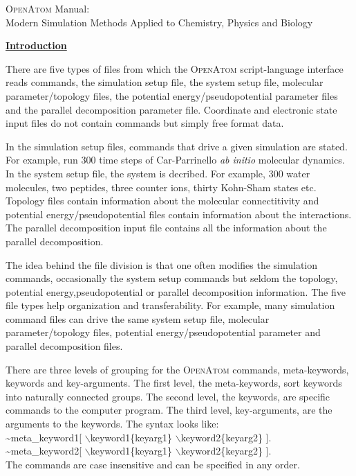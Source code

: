 \documentclass[12pt]{article}
\begin{document}
\large


\vspace*{3.in}
\begin{center}
\huge
\textsc{OpenAtom} Manual: \\
$\ $ \\
\Large
Modern Simulation Methods Applied to Chemistry, Physics and Biology
\end{center}

\clearpage
\huge
\underline{\bf Introduction}
\large

There are five types of files from which the \textsc{OpenAtom}
script-language interface reads commands, the
simulation setup file, the system setup file, molecular parameter/topology
files, the potential energy/pseudopotential parameter files and the
parallel decomposition parameter file. Coordinate and electronic state input files do 
not contain commands but simply free format data. 

In the simulation setup files, commands that drive a given simulation
are stated. For example, run 300 time steps of Car-Parrinello {\em ab initio}
molecular dynamics. In the system setup file, the 
system is decribed. For example, 300 water molecules, two peptides,
three counter ions, thirty Kohn-Sham states etc.  Topology files
contain information about the molecular connectitivity and potential
energy/pseudopotential files contain information about the
interactions. The parallel decomposition
input file contains all the information about the parallel decomposition.

The idea behind the file division is that one often modifies the
simulation commands, occasionally the system setup commands but seldom the 
topology, potential energy,pseudopotential or parallel decomposition
information. 
The five file types help organization and transferability. For
example, many simulation command files can drive the same system setup file, 
molecular parameter/topology files, potential energy/pseudopotential
parameter and parallel decomposition files.

There are three levels of grouping for the \textsc{OpenAtom} commands, 
meta-keywords, keywords and key-arguments.
The first level, the meta-keywords, sort keywords into naturally
connected groups. The second level, the keywords, are specific
commands to the computer program. The third level, key-arguments,
are the arguments to the keywords.  The syntax looks like: \\ 
\hspace*{0.5in} \~{}meta\_keyword1[ $\backslash$keyword1\{keyarg1\}
$\backslash$keyword2\{keyarg2\} ]. \\
\hspace*{0.5in} \~{}meta\_keyword2[ $\backslash$keyword1\{keyarg1\}
$\backslash$keyword2\{keyarg2\} ]. \\
The commands are case insensitive and can be specified in any order.
\end{document}
